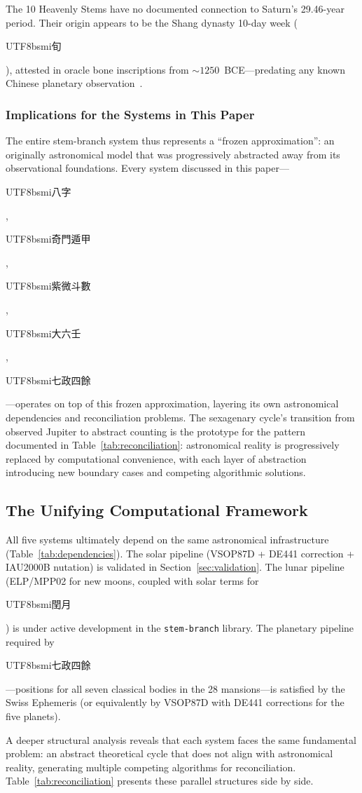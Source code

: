 \documentclass[10pt,a4paper]{article}
\newcommand{\zh}[1]{\begin{CJK}{UTF8}{bsmi}#1\end{CJK}}
\begin{document}
The 10 Heavenly Stems have no documented connection to Saturn's
29.46-year period. Their origin appears to be the Shang dynasty 10-day
week (\zh{旬}), attested in oracle bone inscriptions from
${\sim}1250$~BCE---predating any known Chinese planetary
observation~\cite{smith_2011}.

\subsubsection{Implications for the Systems in This Paper}

The entire stem-branch system thus represents a ``frozen approximation'':
an originally astronomical model that was progressively abstracted away
from its observational foundations. Every system discussed in this
paper---\zh{八字}, \zh{奇門遁甲}, \zh{紫微斗數}, \zh{大六壬},
\zh{七政四餘}---operates on top of this frozen approximation, layering
its own astronomical dependencies and reconciliation problems. The
sexagenary cycle's transition from observed Jupiter to abstract counting
is the prototype for the pattern documented in
Table~\ref{tab:reconciliation}: astronomical reality is progressively
replaced by computational convenience, with each layer of abstraction
introducing new boundary cases and competing algorithmic solutions.

\subsection{The Unifying Computational Framework}

All five systems ultimately depend on the same astronomical infrastructure
(Table~\ref{tab:dependencies}). The solar pipeline (VSOP87D + DE441
correction + IAU2000B nutation) is validated in Section~\ref{sec:validation}.
The lunar pipeline (ELP/MPP02 for new moons, coupled with solar terms for
\zh{閏月}) is under active development in the \texttt{stem-branch} library.
The planetary pipeline required by \zh{七政四餘}---positions for all seven
classical bodies in the 28 mansions---is satisfied by the Swiss Ephemeris
(or equivalently by VSOP87D with DE441 corrections for the five planets).

A deeper structural analysis reveals that each system faces the same
fundamental problem: an abstract theoretical cycle that does not align
with astronomical reality, generating multiple competing algorithms for
reconciliation. Table~\ref{tab:reconciliation} presents these parallel
structures side by side.
\end{document}
